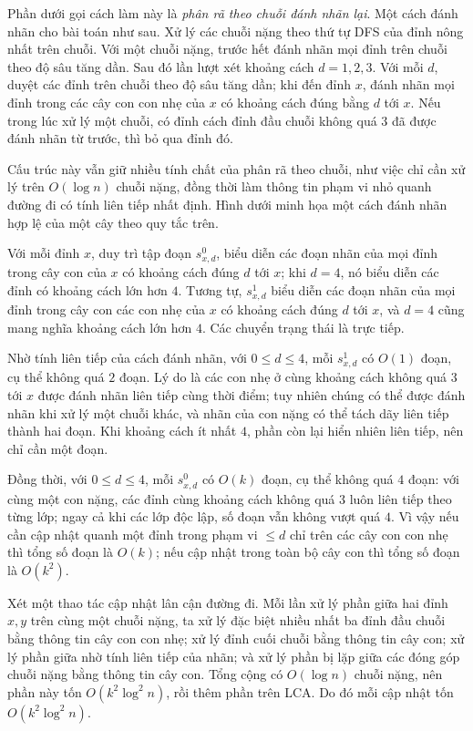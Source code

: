 \documentclass[11pt]{article}
\begin{document}
Phần dưới gọi cách làm này là \emph{phân rã theo chuỗi đánh nhãn lại}. Một
cách đánh nhãn cho bài toán như sau. Xử lý các chuỗi nặng theo thứ tự DFS của
đỉnh nông nhất trên chuỗi. Với một chuỗi nặng, trước hết đánh nhãn mọi đỉnh
trên chuỗi theo độ sâu tăng dần. Sau đó lần lượt xét khoảng cách
\(d=1,2,3\). Với mỗi \(d\), duyệt các đỉnh trên chuỗi theo độ sâu tăng dần; khi
đến đỉnh \(x\), đánh nhãn mọi đỉnh trong các cây con con nhẹ của \(x\) có
khoảng cách đúng bằng \(d\) tới \(x\). Nếu trong lúc xử lý một chuỗi, có đỉnh
cách đỉnh đầu chuỗi không quá \(3\) đã được đánh nhãn từ trước, thì bỏ qua đỉnh
đó.

Cấu trúc này vẫn giữ nhiều tính chất của phân rã theo chuỗi, như việc chỉ cần
xử lý trên \(O(\log n)\) chuỗi nặng, đồng thời làm thông tin phạm vi nhỏ quanh
đường đi có tính liên tiếp nhất định. Hình dưới minh họa một cách đánh nhãn hợp
lệ của một cây theo quy tắc trên.


Với mỗi đỉnh \(x\), duy trì tập đoạn \(s^0_{x,d}\), biểu diễn các đoạn nhãn
của mọi đỉnh trong cây con của \(x\) có khoảng cách đúng \(d\) tới \(x\);
khi \(d=4\), nó biểu diễn các đỉnh có khoảng cách lớn hơn \(4\). Tương tự,
\(s^1_{x,d}\) biểu diễn các đoạn nhãn của mọi đỉnh trong cây con các con nhẹ
của \(x\) có khoảng cách đúng \(d\) tới \(x\), và \(d=4\) cũng mang nghĩa
khoảng cách lớn hơn \(4\). Các chuyển trạng thái là trực tiếp.

Nhờ tính liên tiếp của cách đánh nhãn, với \(0\le d\le 4\), mỗi
\(s^1_{x,d}\) có \(O(1)\) đoạn, cụ thể không quá \(2\) đoạn. Lý do là các con
nhẹ ở cùng khoảng cách không quá \(3\) tới \(x\) được đánh nhãn liên tiếp cùng
thời điểm; tuy nhiên chúng có thể được đánh nhãn khi xử lý một chuỗi khác, và
nhãn của con nặng có thể tách dãy liên tiếp thành hai đoạn. Khi khoảng cách ít
nhất \(4\), phần còn lại hiển nhiên liên tiếp, nên chỉ cần một đoạn.

Đồng thời, với \(0\le d\le 4\), mỗi \(s^0_{x,d}\) có \(O(k)\) đoạn, cụ thể
không quá \(4\) đoạn: với cùng một con nặng, các đỉnh cùng khoảng cách không
quá \(3\) luôn liên tiếp theo từng lớp; ngay cả khi các lớp độc lập, số đoạn
vẫn không vượt quá \(4\). Vì vậy nếu cần cập nhật quanh một đỉnh trong phạm vi
\(\le d\) chỉ trên các cây con con nhẹ thì tổng số đoạn là \(O(k)\); nếu cập
nhật trong toàn bộ cây con thì tổng số đoạn là \(O(k^2)\).

Xét một thao tác cập nhật lân cận đường đi. Mỗi lần xử lý phần giữa hai đỉnh
\(x,y\) trên cùng một chuỗi nặng, ta xử lý đặc biệt nhiều nhất ba đỉnh đầu
chuỗi bằng thông tin cây con con nhẹ; xử lý đỉnh cuối chuỗi bằng thông tin cây
con; xử lý phần giữa nhờ tính liên tiếp của nhãn; và xử lý phần bị lặp giữa
các đóng góp chuỗi nặng bằng thông tin cây con. Tổng cộng có \(O(\log n)\)
chuỗi nặng, nên phần này tốn \(O(k^2\log^2 n)\), rồi thêm phần trên LCA. Do đó
mỗi cập nhật tốn \(O(k^2\log^2 n)\).
\end{document}
